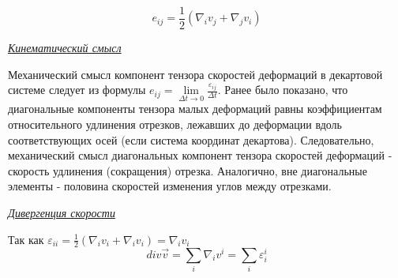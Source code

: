 $$e_{ij} = \frac{1}{2} \left(\nabla_{i}v_{j} + \nabla_{j}v_{i}\right)$$

\begin{center}
	\textit{\underline{Кинематический смысл}}
\end{center}
Механический смысл компонент тензора скоростей деформаций в декартовой системе следует из формулы $e_{ij} = \lim\limits_{\Delta t \rightarrow 0} \frac{\varepsilon_{ij}}{\Delta t}$. Ранее было показано, что диагональные компоненты тензора малых деформаций равны коэффициентам относительного удлинения отрезков, лежавших до деформации вдоль соответствующих осей (если система координат декартова). Следовательно, механический смысл диагональных компонент тензора скоростей деформаций - скорость удлинения (сокращения) отрезка. Аналогично, вне диагональные элементы - половина скоростей изменения углов между отрезками. 

\begin{center}
	\textit{\underline{Дивергенция скорости}}
\end{center}
Так как $\varepsilon_{ii} = \frac{1}{2} \left(\nabla_{i}v_{i} + \nabla_{i}v_{i} \right) = \nabla_{i}v_{i}$
$$div \overrightarrow{v} = \sum\limits_{i} \nabla_{i} v^i = \sum\limits_{i} \varepsilon^{i}_{i}$$